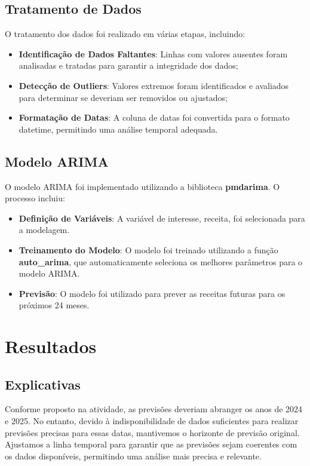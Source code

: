 \documentclass[a4paper,12pt]{article}
\begin{document}
\subsection{Tratamento de Dados}

O tratamento dos dados foi realizado em várias etapas, incluindo:

\begin{itemize}
    \item \textbf{Identificação de Dados Faltantes}: Linhas com valores ausentes foram analisadas e tratadas para garantir a integridade dos dados;
    \item \textbf{Detecção de Outliers}: Valores extremos foram identificados e avaliados para determinar se deveriam ser removidos ou ajustados;
    \item \textbf{Formatação de Datas}: A coluna de datas foi convertida para o formato datetime, permitindo uma análise temporal adequada.
\end{itemize}

\subsection{Modelo ARIMA}

O modelo ARIMA foi implementado utilizando a biblioteca \textbf{pmdarima}. O processo incluiu:

\begin{itemize}
    \item \textbf{Definição de Variáveis}: A variável de interesse, receita, foi selecionada para a modelagem.
    \item \textbf{Treinamento do Modelo}: O modelo foi treinado utilizando a função \textbf{auto\_arima}, que automaticamente seleciona os melhores parâmetros para o modelo ARIMA.
    \item \textbf{Previsão}: O modelo foi utilizado para prever as receitas futuras para os próximos 24 meses.
\end{itemize}

\section{Resultados}
\subsection{Explicativas}
Conforme proposto na atividade, as previsões deveriam abranger os anos de 2024 e 2025. No entanto, devido à indisponibilidade de dados suficientes para realizar previsões precisas para essas datas, mantivemos o horizonte de previsão original. Ajustamos a linha temporal para garantir que as previsões sejam coerentes com os dados disponíveis, permitindo uma análise mais precisa e relevante.
\end{document}
